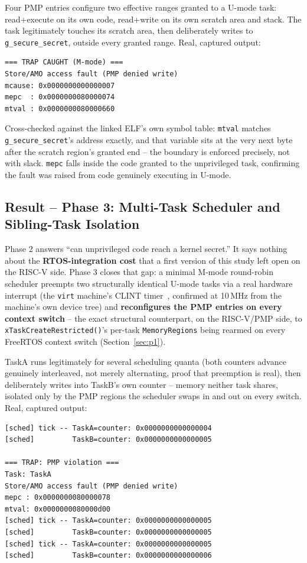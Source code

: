 \documentclass[sigconf,nonacm]{acmart}
\begin{document}
Four PMP entries configure two effective ranges granted to a U-mode task: read+execute on its own code, read+write on its own scratch area and stack. The task legitimately touches its scratch area, then deliberately writes to \texttt{g\_secure\_secret}, outside every granted range. Real, captured output:

\begin{lstlisting}[style=term]
=== TRAP CAUGHT (M-mode) ===
Store/AMO access fault (PMP denied write)
mcause: 0x0000000000000007
mepc  : 0x0000000080000074
mtval : 0x0000000080000660
\end{lstlisting}

Cross-checked against the linked ELF's own symbol table: \texttt{mtval} matches \texttt{g\_secure\_secret}'s address exactly, and that variable sits at the very next byte after the scratch region's granted end -- the boundary is enforced precisely, not with slack. \texttt{mepc} falls inside the code granted to the unprivileged task, confirming the fault was raised from code genuinely executing in U-mode.

\subsection{Result -- Phase 3: Multi-Task Scheduler and Sibling-Task Isolation}
\label{sec:p7-phase3}

Phase 2 answers ``can unprivileged code reach a kernel secret.'' It says nothing about the \textbf{RTOS-integration cost} that a first version of this study left open on the RISC-V side. Phase 3 closes that gap: a minimal M-mode round-robin scheduler preempts two structurally identical U-mode tasks via a real hardware interrupt (the \texttt{virt} machine's CLINT timer~\cite{sifive-clint}, confirmed at 10\,MHz from the machine's own device tree) and \textbf{reconfigures the PMP entries on every context switch} -- the exact structural counterpart, on the RISC-V/PMP side, to \texttt{xTaskCreateRestricted()}'s per-task \texttt{MemoryRegions} being rearmed on every FreeRTOS context switch (Section~\ref{sec:p1}).

TaskA runs legitimately for several scheduling quanta (both counters advance genuinely interleaved, not merely alternating, proof that preemption is real), then deliberately writes into TaskB's own counter -- memory neither task shares, isolated only by the PMP regions the scheduler swaps in and out on every switch. Real, captured output:

\begin{lstlisting}[style=term]
[sched] tick -- TaskA=counter: 0x0000000000000004
[sched]         TaskB=counter: 0x0000000000000005

=== TRAP: PMP violation ===
Task: TaskA
Store/AMO access fault (PMP denied write)
mepc : 0x0000000080000078
mtval: 0x0000000080000d00
[sched] tick -- TaskA=counter: 0x0000000000000005
[sched]         TaskB=counter: 0x0000000000000005
[sched] tick -- TaskA=counter: 0x0000000000000005
[sched]         TaskB=counter: 0x0000000000000006
\end{lstlisting}
\end{document}
